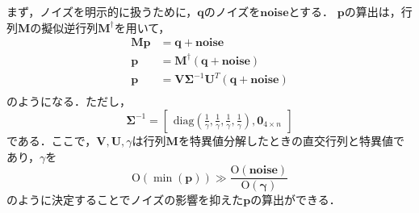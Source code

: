 \documentclass[a4paper]{jarticle}
\begin{document}
まず，ノイズを明示的に扱うために，$\mathbf{q}$のノイズを$\mathbf{noise}$とする．
$\mathbf{p}$の算出は，行列$\mathbf{M}$の擬似逆行列$\mathbf{M}^{\dagger}$を用いて，
\begin{equation}
    \begin{aligned}
    \mathbf{M}\mathbf{p} &= \mathbf{q} + \mathbf{noise}\\
              \mathbf{p} &= \mathbf{M}^{\dagger}(\mathbf{q} + \mathbf{noise})\\ 
            \mathbf{p} &= \mathbf{V}\mathbf{\Sigma}^{-1}\mathbf{U}^T(\mathbf{q}+\mathbf{noise})\\
    \end{aligned}
\end{equation}
のようになる．ただし，
\begin{equation}
            \mathbf{\Sigma}^{-1} =
            \begin{bmatrix}
                 \mathrm{diag}(\frac{1}{\gamma}, \frac{1}{\gamma}, \frac{1}{\gamma}, \frac{1}{\gamma}), \mathbf{0}_{4 \times n}
            \end{bmatrix}
\end{equation}
である．ここで，$\mathbf{V},\mathbf{U},\gamma$は行列$\mathbf{M}$を特異値分解したときの直交行列と特異値であり，$\gamma$を
\begin{equation}
    \mathrm{O}(\min({\mathbf{p}})) \gg \frac{\mathrm{O}(\mathbf{noise})}{\mathrm{O}(\mathbf{\gamma})}
    \label{eq:gamma}
\end{equation}
のように決定することでノイズの影響を抑えた$\mathbf{p}$の算出ができる．
\end{document}
